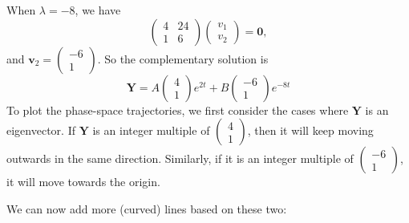 \documentclass[a4paper]{article}
\begin{document}
\begin{eg}
  When $\lambda = -8$, we have
  \[
    \begin{pmatrix}
      4 & 24\\
      1 & 6
    \end{pmatrix}
    \begin{pmatrix}
      v_1\\v_2
    \end{pmatrix} = \mathbf{0},
  \]
  and $\mathbf{v}_2 =
  \begin{pmatrix}
    -6 \\1
  \end{pmatrix}$. So the complementary solution is
  \[
    \mathbf{Y} = A
    \begin{pmatrix}
      4\\1
    \end{pmatrix}e^{2t} + B
    \begin{pmatrix}
      -6\\1
    \end{pmatrix}e^{-8t}
  \]
  To plot the phase-space trajectories, we first consider the cases where $\mathbf{Y}$ is an eigenvector.  If $\mathbf{Y}$ is an integer multiple of $\begin{pmatrix}4\\1\end{pmatrix}$, then it will keep moving outwards in the same direction. Similarly, if it is an integer multiple of $\begin{pmatrix}-6\\1\end{pmatrix}$, it will move towards the origin.
  \begin{center}
  \end{center}
  We can now add more (curved) lines based on these two:
  \begin{center}
\end{center}
\end{eg}
\end{document}
